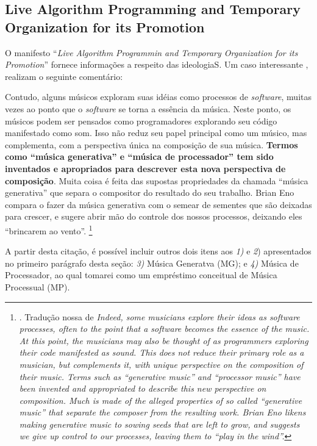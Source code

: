 \subsection{Live Algorithm Programming and Temporary Organization for its Promotion}

O manifesto ``\emph{Live Algorithm Programmin and Temporary Organization for its Promotion}'' \cite{ward_live_2004} fornece informações a respeito das ideologiaS. Um caso interessante ,  realizam o seguinte comentário:

\begin{citacao}
Contudo, alguns músicos exploram suas idéias como processos de \emph{software}, muitas vezes ao ponto que o \emph{software} se torna a essência da música. Neste ponto, os músicos podem ser pensados como programadores explorando seu código manifestado como som. Isso não reduz seu papel principal como um músico, mas complementa, com a perspectiva única na composição de sua música. \textbf{Termos como ``música generativa'' e ``música de processador'' tem sido inventados e apropriados para descrever esta nova perspectiva de composição}. Muita coisa é feita das supostas propriedades da chamada ``música generativa'' que separa o compositor do resultado do seu trabalho. Brian Eno compara o fazer da música generativa com o semear de sementes que são deixadas para crescer, e sugere abrir mão do controle dos nossos processos, deixando eles ``brincarem ao vento''. \footnote{. Tradução nossa de \emph{Indeed, some musicians explore their ideas as software processes, often to the point that a software becomes the essence of the music. At this point, the musicians may also be thought of as programmers exploring their code manifested as sound. This does not reduce their primary role as a musician, but complements it, with unique perspective on the composition of their music. Terms such as “generative music” and “processor music” have been invented and appropriated to describe this new perspective on composition. Much is made of the alleged properties of so called “generative music” that separate the composer from the resulting work. Brian Eno likens making generative music to sowing seeds that are left to grow, and suggests we give up control to our processes, leaving them to “play in the wind”.}}
\end{citacao}

A partir desta citação, é possível incluir outros dois itens aos \emph{1)} e \emph{2}) apresentados no primeiro parágrafo desta seção: \emph{3)} Música Generatva (MG); e \emph{4)} Música de Processador, ao qual tomarei como um empréstimo conceitual de Música Processual (MP).

